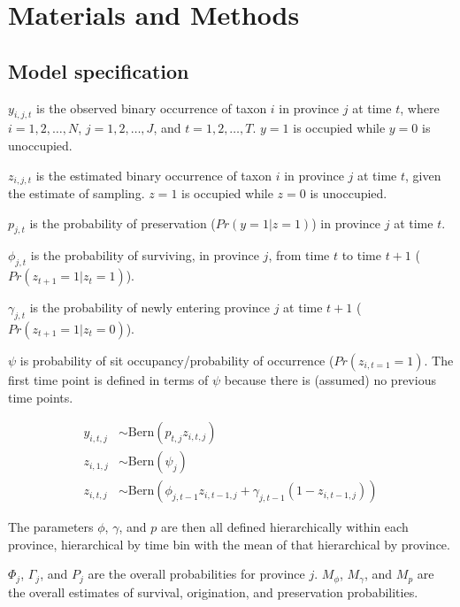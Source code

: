 \documentclass[12pt,letterpaper]{article}
\begin{document}
\section{Materials and Methods}

\subsection{Model specification}

\(y_{i, j, t}\) is the observed binary occurrence of taxon \(i\) in province \(j\) at time \(t\), where \(i = 1, 2, \dots, N\), \(j = 1, 2, \dots, J\), and \(t = 1, 2, \dots, T\). \(y = 1\) is occupied while \(y = 0\) is unoccupied.

\(z_{i, j, t}\) is the estimated binary occurrence of taxon \(i\) in province \(j\) at time \(t\), given the estimate of sampling. \(z = 1\) is occupied while \(z = 0\) is unoccupied.

\(p_{j, t}\) is the probability of preservation (\(Pr(y = 1 | z = 1)\)) in province \(j\) at time \(t\).

\(\phi_{j, t}\) is the probability of surviving, in province \(j\), from time \(t\) to time \(t + 1\) (\(Pr(z_{t + 1} = 1 | z_{t} = 1)\)).

\(\gamma_{j, t}\) is the probability of newly entering province \(j\) at time \(t + 1\) (\(Pr(z_{t + 1} = 1 | z_{t} = 0)\)).

\(\psi\) is probability of sit occupancy/probability of occurrence (\(Pr(z_{i, t = 1} = 1)\). The first time point is defined in terms of \(\psi\) because there is (assumed) no previous time points.

\begin{equation}
  \begin{aligned}
    y_{i, t, j} &\sim \mathrm{Bern}(p_{t, j} z_{i, t, j}) \\
    z_{i, 1, j} &\sim \mathrm{Bern}(\psi_{j}) \\
    z_{i, t, j} &\sim \mathrm{Bern}(\phi_{j, t - 1} z_{i, t - 1, j} + \gamma_{j, t - 1} (1 - z_{i, t - 1, j}))
  \end{aligned}
\end{equation}

The parameters \(\phi\), \(\gamma\), and \(p\) are then all defined hierarchically within each province, hierarchical by time bin with the mean of that hierarchical by province.

\(\Phi_{j}\), \(\Gamma_{j}\), and \(P_{j}\) are the overall probabilities for province \(j\). \(M_{\phi}\), \(M_{\gamma}\), and \(M_{p}\) are the overall estimates of survival, origination, and preservation probabilities.
\end{document}
